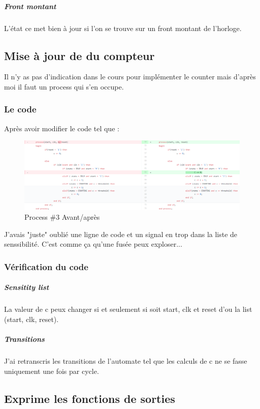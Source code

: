 \documentclass{article}
\begin{document}
\subparagraph{Front montant}
L'état ce met bien à jour si l'on se trouve sur un front montant de l'horloge.


	
\subsection{Mise à jour de du compteur}

	Il n'y as pas d'indication dans le cours pour implémenter le counter mais d'après moi il faut un process qui s'en occupe.
	

\subsubsection{Le code}

Après avoir modifier le code tel que : 
\begin{figure}[!h]
\advance\leftskip-0.4cm
\includegraphics[scale=0.55]{oldProc2.PNG}
\caption{Process \#3 Avant/après }
\end{figure}

\newpage


J'avais "juste" oublié une ligne de code et un signal en trop dans la liste de senssibilité. C'est comme ça qu'une fusée peux exploser...
 
\subsubsection{Vérification du code}
\subparagraph{Sensitity list} La valeur de c peux changer si et seulement si soit start, clk et reset d'ou la list (start, clk, reset). 
	
	


\subparagraph{Transitions}
J'ai retranscris les transitions de l'automate tel que les calculs de c ne se fasse uniquement une fois par cycle.  



\subsection{Exprime les fonctions de sorties}
\end{document}
